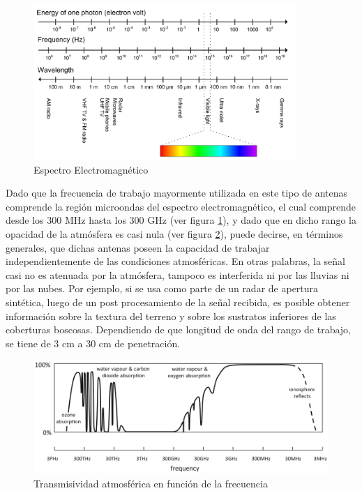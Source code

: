 \begin{figure}[H]
 \centering
 \includegraphics[width=10cm]{gfx/electromagneticSpectrum.png}
 \caption{Espectro Electromagnético \cite{electromagneticField}}
 \label{fig:spectrum}
\end{figure}

Dado que la frecuencia de trabajo mayormente utilizada en este tipo de antenas comprende la región microondas del espectro
electromagnético, el cual comprende desde los 300 MHz hasta los 300 GHz (ver figura \ref{fig:spectrum}), y dado que en dicho rango la 
opacidad de la atmósfera es casi nula (ver figura \ref{fig:atmosphere}), puede decirse, en términos generales, que dichas 
antenas poseen la capacidad de trabajar independientemente de las condiciones atmosféricas. En otras palabras, la señal casi no es 
atenuada por la atmósfera, tampoco es interferida ni por las lluvias ni por las nubes. Por ejemplo, si se usa como parte de un 
radar de apertura sintética, luego de un post procesamiento de la señal recibida, es posible obtener información sobre la 
textura del terreno y sobre los sustratos inferiores de las coberturas boscosas. Dependiendo de que longitud de onda del rango de
trabajo, se tiene de 3 cm a 30 cm de penetración.

\begin{figure}[H]
 \centering
 \includegraphics[width=12cm]{gfx/atmosphericOpacity.png}
 \caption{Transmisividad atmosférica en función de la frecuencia \cite{Richards2013}}
 \label{fig:atmosphere}
\end{figure}

